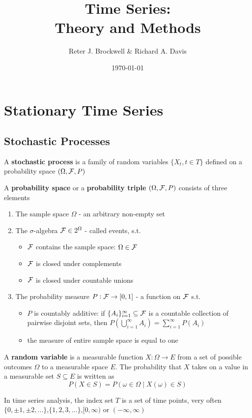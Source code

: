 \documentclass[11pt]{article}
\author{Reter J. Brockwell \& Richard A. Davis}
\date{\today}
\title{\aunclfamily\Huge Time Series:\\ Theory and Methods}
\begin{document}
\maketitle \clearpage
\tableofcontents \clearpage
\section{Stationary Time Series}
\label{sec:org2b75ac1}

\subsection{Stochastic Processes}
\label{sec:orgf5949fa}
\begin{definition}[]
A \textbf{stochastic process} is a family of random variables \(\{X_t,t\in T\}\) defined
on a probability space \((\Omega,\mathcal{F},P)\)
\end{definition}

A \textbf{probability space} or a \textbf{probability triple} \((\Omega,\mathcal{F},P)\) consists of three
elements
\begin{enumerate}
\item The sample space \(\Omega\) - an arbitrary non-empty set
\item The \(\sigma\)-algebra \(\mathcal{F}\in 2^{\Omega}\) - called events, s.t.
\begin{itemize}
\item \(\mathcal{F}\) contains the sample space: \(\Omega\in\mathcal{F}\)
\item \(\mathcal{F}\) is closed under complements
\item \(\mathcal{F}\) is closed under countable unions
\end{itemize}
\item The probability measure \(P:\mathcal{F}\to[0,1]\) - a function on \(\mathcal{F}\) s.t.
\begin{itemize}
\item \(P\) is countably additive: if \(\{A_i\}_{i=1}^\infty\subseteq\mathcal{F}\) is a
countable collection of pairwise disjoint sets, then
\(P(\bigcup_{i=1}^\infty A_i)=\sum_{i=1}^\infty P(A_i)\)
\item the measure of entire sample space is equal to one
\end{itemize}
\end{enumerate}


A \textbf{random variable} is a measurable function \(X:\Omega\to E\) from a set of
possible outcomes \(\Omega\) to a measurable space \(E\). The probability that \(X\) takes
on a value in a measurable set \(S\subseteq E\) is written as
\begin{equation*}
P(X\in S)=P({\omega\in\Omega\mid X(\omega)\in S})
\end{equation*}
\begin{remark}
In time series analysis, the index set \(T\) is a set of time points, very
often
\(\{0,\pm 1,\pm 2,\dots\}\),\(\{1,2,3,\dots\}\),\([0,\infty)\) or \((-\infty,\infty)\)
\end{remark}
\end{document}
